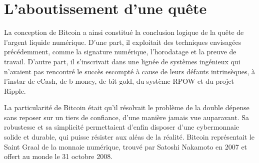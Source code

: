 \begin{quote}
\end{quote} %



\section*{L'aboutissement d'une quête}

La conception de Bitcoin a ainsi constitué la conclusion logique de la quête de l'argent liquide numérique. D'une part, il exploitait des techniques envisagées précédemment, comme la signature numérique, l'horodatage et la preuve de travail. D'autre part, il s'inscrivait dans une lignée de systèmes ingénieux qui n'avaient pas rencontré le succès escompté à cause de leurs défauts intrinsèques, à l'instar de eCash, de b-money, de bit gold, du système RPOW et du projet Ripple.

La particularité de Bitcoin était qu'il résolvait le problème de la double dépense sans reposer sur un tiers de confiance, d'une manière jamais vue auparavant. Sa robustesse et sa simplicité permettaient d'enfin disposer d'une cybermonnaie solide et durable, qui puisse résister aux aléas de la réalité. Bitcoin représentait le Saint Graal de la monnaie numérique, trouvé par Satoshi Nakamoto en 2007 et offert au monde le 31 octobre 2008.
